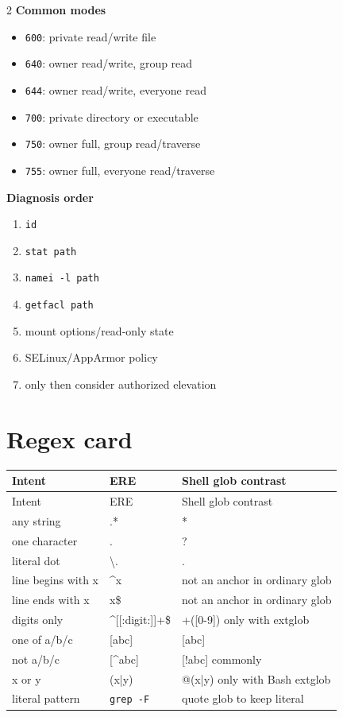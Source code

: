 \documentclass[11pt,oneside,openany]{book}
\begin{document}
\begin{multicols}{2}
\textbf{Common modes}
\begin{itemize}
  \item \texttt{600}: private read/write file
  \item \texttt{640}: owner read/write, group read
  \item \texttt{644}: owner read/write, everyone read
  \item \texttt{700}: private directory or executable
  \item \texttt{750}: owner full, group read/traverse
  \item \texttt{755}: owner full, everyone read/traverse
\end{itemize}

\columnbreak
\textbf{Diagnosis order}
\begin{enumerate}
  \item \texttt{id}
  \item \texttt{stat path}
  \item \texttt{namei -l path}
  \item \texttt{getfacl path}
  \item mount options/read-only state
  \item SELinux/AppArmor policy
  \item only then consider authorized elevation
\end{enumerate}
\end{multicols}

\section{Regex card}
\begin{longtable}{>{\ttfamily}p{}p{}p{}}
\toprule
Intent & ERE & Shell glob contrast \\
\midrule
\endfirsthead\toprule Intent & ERE & Shell glob contrast \\
\midrule\endhead
any string & .* & * \\
one character & . & ? \\
literal dot & \textbackslash. & . \\
line begins with x & \textasciicircum{}x & not an anchor in ordinary glob \\
line ends with x & x\$ & not an anchor in ordinary glob \\
digits only & \textasciicircum{}[[:digit:]]+\$ & +([0-9]) only with extglob \\
one of a/b/c & [abc] & [abc] \\
not a/b/c & [\textasciicircum{}abc] & [!abc] commonly \\
x or y & (x|y) & @(x|y) only with Bash extglob \\
literal pattern & \texttt{grep -F} & quote glob to keep literal \\
\bottomrule
\end{longtable}
\end{document}
